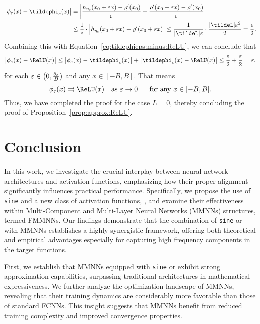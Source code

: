 \documentclass[11pt,a4paper]{article}
\begin{document}
\begin{equation*}
	\begin{split}
		\big|\phi_{\eps}(x)-\tildephi_{\eps}(x)\big|
        &=  \bigg|\frac{h_{\eta_\eps}(x_0+\eps x)-\varrho^{\prime}(x_0)}{\eps}
         -\frac{\varrho^{\prime}(x_0+\eps x)-\varrho^{\prime}(x_0)}{\eps} \bigg|\\	
		&\le  \frac{1}{\eps}\cdot\Big|	h_{\eta_\eps}(x_0+\eps x)-\varrho^{\prime}(x_0+\eps x)\Big|
		\le \frac{1}{|\tildeL|\eps}\cdot\frac{|\tildeL|\eps^2}{2}=\frac{\eps}{2}.
	\end{split}
\end{equation*}
Combining this with Equation~\eqref{eq:tildephieps:minus:ReLU}, we can conclude that
\begin{equation*}
	\big|\phi_\eps(x)-\ReLU(x)\big|\le \big|\phi_\eps(x)-\tildephi_\eps(x)\big|+\big|\tildephi_\eps(x)-\ReLU(x)\big|\le \frac{\eps}{2}+ \frac{\eps}{2}=\eps,
\end{equation*}
for each $\varepsilon\in \big(0,\tfrac{\delta_\varepsilon}{B}\big)$ and any $x\in [-B,B]$. That means
	\begin{equation*}
	\phi_\eps(x)\rightrightarrows \ReLU(x)\quad \tn{as}\   \eps\to 0^+\quad \tn{for any $x\in [-B,B]$.}
\end{equation*}
Thus, we have completed the proof for the case \( L = 0 \), thereby concluding the proof of Proposition~\ref{prop:approx:ReLU}.





\section{Conclusion}
\label{sec:conclusion}

In this work, we investigate the crucial interplay between neural network architectures and activation functions, emphasizing how their proper alignment significantly influences practical performance. Specifically, we propose the use of \texttt{sine} and a new class of activation functions, , and examine their effectiveness within Multi-Component and Multi-Layer Neural Networks (MMNNs) structures, termed FMMNNs. Our findings demonstrate that the combination of \texttt{sine} or  with MMNNs establishes a highly synergistic framework, offering both theoretical and empirical advantages especially for capturing high frequency components in the target functions.

First, we establish that MMNNs equipped with \texttt{sine} or  exhibit strong approximation capabilities, surpassing traditional architectures in mathematical expressiveness. We further analyze the optimization landscape of MMNNs, revealing that their training dynamics are considerably more favorable than those of standard FCNNs. This insight suggests that MMNNs benefit from reduced training complexity and improved convergence properties.
\end{document}
